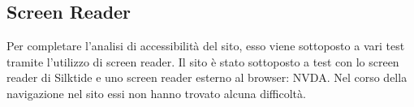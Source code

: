 \documentclass{article}
\begin{document}
\subsection{Screen Reader}
Per completare l'analisi di accessibilità del sito, esso viene sottoposto a vari test tramite l'utilizzo di screen reader. Il sito è stato sottoposto a test con lo screen reader di Silktide e uno screen reader esterno al browser: NVDA. Nel corso della navigazione nel sito essi non hanno trovato alcuna difficoltà.
\end{document}

